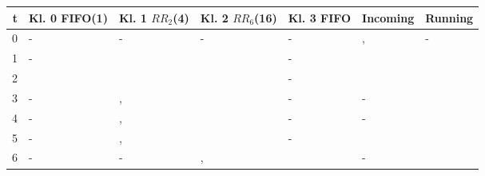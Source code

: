 \documentclass[a4paper, 11pt]{article}
\begin{document}
    \begin{figure}[h]
      \begin{tabular}{r|l|l|l|l|l|l}
        t      & Kl. 0 FIFO(1)   & Kl. 1 $RR_2$(4)   & Kl. 2 $RR_6$(16)  & Kl. 3 FIFO      & Incoming     & Running   \\
        \hline
        0      & -                             & -                                                                                       & -                                                    & -                               & \color{blue}{$A(7)$},\color{brightlavender}{$B(6)$}  &  -      \\
        1      & -                             & \color{blue}{$A(7)$}                                                                    & \color{brightlavender}{$B(6)$}                       & -                               & \color{olive}{$C(1)$}                                & \color{blue}{$A(7)$}       \\
        2      & \color{olive}{$C(1)$}         & \color{blue}{$A(6)$}                                                                    & \color{brightlavender}{$B(6)$}                       & -                               & \color{green}{$D(2)$}                                & \color{olive}{$C(1)$}         \\
        3      & -                             & \color{blue}{$A(6)$},\color{green}{$D(2)$}                                              & \color{brightlavender}{$B(6)$}                       & -                               & -                                                    & \color{blue}{$A(6)$}       \\
        4      & -                             & \color{green}{$D(2)$},\color{blue}{$A(5)$}                                              & \color{brightlavender}{$B(6)$}                       & -                               & -                                                    & \color{green}{$D(2)$}       \\
        5      & -                             & \color{green}{$D(1)$},\color{blue}{$A(5)$}                                              & \color{brightlavender}{$B(6)$}                       & -                               & \color{fulvous}{$E(17)$}                             & \color{green}{$D(1)$}       \\
        6      & -                             & -                                                                                       & \color{brightlavender}{$B(6)$},\color{blue}{$A(5)$}  & \color{fulvous}{$E(17)$}        & -                                                    & \color{blue}{$A(5)$}       \\

\end{tabular}
\end{figure}
\end{document}
